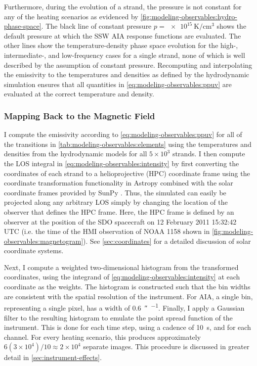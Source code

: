 Furthermore, during the evolution of a strand, the pressure is not constant for any of the heating scenarios as evidenced by \autoref{fig:modeling-observables:hydro-phase-space}. The black line of constant pressure $p=\SI{e15}{\kelvin\per\cubic\cm}$ shows the default pressure at which the SSW AIA response functions are evaluated. The other lines show the temperature-density phase space evolution for the high-, intermediate-, and low-frequency cases for a single strand, none of which is well described by the assumption of constant pressure.  Recomputing and interpolating the emissivity to the temperatures and densities as defined by the hydrodynamic simulation ensures that all quantities in \autoref{eq:modeling-observables:ppuv} are evaluated at the correct temperature and density.

\subsubsection{Mapping Back to the Magnetic Field}\label{sec:modeling-observables:mapping}

I compute the emissivity according to \autoref{eq:modeling-observables:ppuv} for all of the transitions in \autoref{tab:modeling-observables:elements} using the temperatures and densities from the hydrodynamic models for all $5\times10^3$ strands. I then compute the LOS integral in \autoref{eq:modeling-observables:intensity} by first converting the coordinates of each strand to a helioprojective (HPC) coordinate frame \citep[see][]{thompson_coordinate_2006} using the coordinate transformation functionality in Astropy \citep{the_astropy_collaboration_astropy_2018} combined with the solar coordinate frames provided by SunPy \citep{sunpy_community_sunpypython_2015}. Thus, the simulated \AR{} can easily be projected along any arbitrary LOS simply by changing the location of the observer that defines the HPC frame. Here, the HPC frame is defined by an observer at the position of the SDO spacecraft on 12 February 2011 15:32:42 UTC (i.e. the time of the HMI observation of NOAA 1158 shown in \autoref{fig:modeling-observables:magnetogram}). See \autoref{sec:coordinates} for a detailed discussion of solar coordinate systems.

Next, I compute a weighted two-dimensional histogram from the transformed coordinates, using the integrand of \autoref{eq:modeling-observables:intensity} at each coordinate as the weights. The histogram is constructed such that the bin widths are consistent with the spatial resolution of the instrument. For AIA, a single bin, representing a single pixel, has a width of \SI{0.6}{\arcsecond\per\pixel}. Finally, I  apply a Gaussian filter to the resulting histogram to emulate the point spread function of the instrument. This is done for each time step, using a cadence of \SI{10}{\second}, and for each channel. For every heating scenario, this produces approximately $6(3\times10^4)/10\approx2\times10^4$ separate images. This procedure is discussed in greater detail in \autoref{sec:instrument-effects}.

